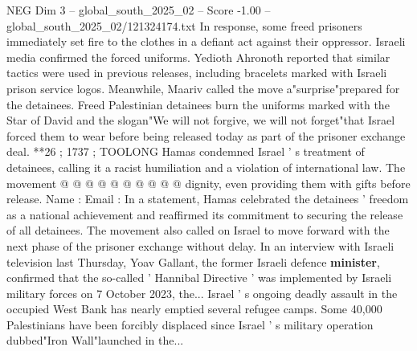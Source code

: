 \begin{textsample}{NEG Dim 3 – global\_south\_2025\_02 – Score -1.00 – global\_south\_2025\_02/121324174.txt}
In response, some freed prisoners immediately set fire to the clothes in a defiant act against their oppressor.
Israeli media confirmed the forced uniforms.
Yedioth Ahronoth reported that similar tactics were used in previous releases, including bracelets marked with Israeli prison service logos.
Meanwhile, Maariv called the move a"surprise"prepared for the detainees.
Freed Palestinian detainees burn the uniforms marked with the Star of David and the slogan"We will not forgive, we will not forget"that Israel forced them to wear before being released today as part of the prisoner exchange deal. **26 ; 1737 ; TOOLONG Hamas condemned Israel ' s treatment of detainees, calling it a racist humiliation and a violation of international law.
The movement @ @ @ @ @ @ @ @ @ @ dignity, even providing them with gifts before release.
Name : Email : In a statement, Hamas celebrated the detainees ' freedom as a national achievement and reaffirmed its commitment to securing the release of all detainees.
The movement also called on Israel to move forward with the next phase of the prisoner exchange without delay.
In an interview with Israeli television last Thursday, Yoav Gallant, the former Israeli defence \textbf{minister}, confirmed that the so-called ' Hannibal Directive ' was implemented by Israeli military forces on 7 October 2023, the...
Israel ' s ongoing deadly assault in the occupied West Bank has nearly emptied several refugee camps.
Some 40,000 Palestinians have been forcibly displaced since Israel ' s military operation dubbed"Iron Wall"launched in the...

\end{textsample}
